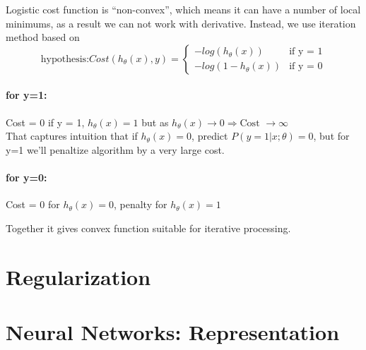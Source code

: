 \documentclass{scrartcl}
\begin{document}
Logistic cost function is ``non-convex'', which means it can have a
number of local minimums, as a result we can not work with derivative.
Instead, we use iteration method based on \[ \textrm{hypothesis:}
Cost(h_\theta(x), y) = \left\{ \begin{array}
    {rr} -log(h_\theta(x)) & \textrm{if y = 1} \\
    -log(1- h_\theta(x)) & \textrm{if y = 0}
  \end{array} \right. \]

\paragraph{for y=1:}
Cost = 0 if y = 1, $h_\theta(x) = 1$
but as $h_\theta(x) \to 0 \Rightarrow \textrm{Cost } \to \infty $ \\
That captures intuition that if $h_\theta(x) = 0$, predict
$P(y=1|x;\theta) = 0$, but for y=1 we'll penaltize algorithm by a very
large cost.

\paragraph{for y=0:}
Cost = 0 for $h_\theta(x) = 0$, penalty for $h_\theta(x) = 1$

Together it gives convex function suitable for iterative processing.

\label{6-5}


\label {Chapter 7}
\section {Regularization}

\label {Chapter 8}
\section {Neural Networks: Representation}


\end{document}
